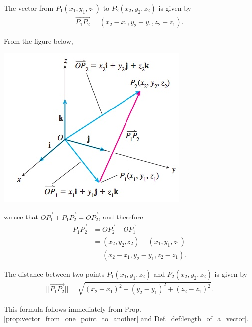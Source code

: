 \documentclass[12pt,letterpaper,reqno]{article}
\numberwithin{equation}{section}
\begin{document}
\begin{prop}\label{prop:vector_from_one_point_to_another}
	The vector from $P_1(x_1,y_1,z_1)$ to $P_2(x_2,y_2,z_2)$ is given by
	\begin{align*}
		\overrightarrow{P_1P_2}=(x_2-x_1,y_2-y_1,z_2-z_1).
	\end{align*}
\end{prop}

\begin{pf}
From the figure below, 
\begin{center}
	\includegraphics[scale=0.5]{figures_mvc/P1P2}
\end{center}

we see that $\overrightarrow{OP_1}+\overrightarrow{P_1P_2}=\overrightarrow{OP_2}$, and therefore
\begin{align*}
	\overrightarrow{P_1P_2}&=\overrightarrow{OP_2}-\overrightarrow{OP_1} \\
	&=(x_2,y_2,z_2)-(x_1,y_1,z_1) \\
	&=(x_2-x_1,y_2-y_1,z_2-z_1).
\end{align*}	
\end{pf}

\begin{cor}
	The distance between two points $P_1(x_1,y_1,z_2)$ and $P_2(x_2,y_2,z_2)$ is given by
	\begin{align*}
		||\overrightarrow{P_1P_2}||=\sqrt{(x_2-x_1)^2+(y_2-y_1)^2+(z_2-z_1)^2}.
	\end{align*}
\end{cor}

\begin{pf}
	This formula follows immediately from Prop. \ref{prop:vector_from_one_point_to_another} and Def. \ref{def:length_of_a_vector}.
\end{pf}
\end{document}

